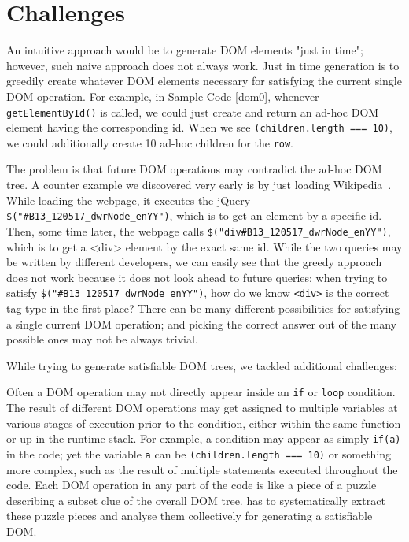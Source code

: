 \section{Challenges}
An intuitive approach would be to generate DOM elements "just in time"; however, such naive approach does not always work.
Just in time generation is to greedily create whatever DOM elements necessary for satisfying the current single DOM operation.
For example, in Sample Code \ref{dom0}, whenever {\tt getElementById()} is called, we could just create and return an ad-hoc DOM element having the corresponding id.
When we see {\tt (children.length === 10)}, we could additionally create 10 ad-hoc children for the {\tt row}.

The problem is that future DOM operations may contradict the ad-hoc DOM tree.  
A counter example we discovered very early is by just loading Wikipedia~\cite{wikipedia}.  
While loading the webpage, it executes the jQuery {\tt \$("\#B13\_120517\_dwrNode\_enYY")}, which is to get an element by a specific id.  
Then, some time later, the webpage calls {\tt \$("div\#B13\_120517\_dwrNode\_enYY")}, which is to get a <div> element by the exact same id.
While the two queries may be written by different developers, we can easily see that the greedy approach does not work because it does not look ahead to future queries: when trying to satisfy {\tt \$("\#B13\_120517\_dwrNode\_enYY")}, how do we know {\tt <div>} is the correct tag type in the first place?
There can be many different possibilities for satisfying a single current DOM operation; and picking the correct answer out of the many possible ones may not be always trivial.

While trying to generate satisfiable DOM trees, we tackled additional challenges:

  Often a DOM operation may not directly appear inside an {\tt if} or {\tt loop} condition.  
The result of different DOM operations may get assigned to multiple variables at various stages of execution prior to the condition, either within the same function or up in the runtime stack.
For example, a condition may appear as simply {\tt if(a)} in the code; yet the variable {\tt a} can be {\tt (children.length === 10)} or something more complex, such as the result of multiple statements executed throughout the code.
Each DOM operation in any part of the code is like a piece of a puzzle describing a subset clue of the overall DOM tree.  \tool has to systematically extract these puzzle pieces and analyse them collectively for generating a satisfiable DOM.

